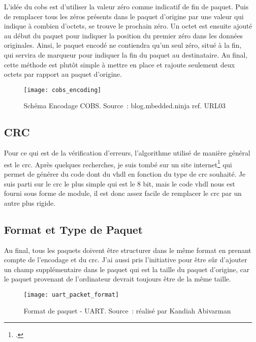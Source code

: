 L’idée du \gls{cobs} est d’utiliser la valeur zéro comme indicatif de fin de paquet. 
Puis de remplacer tous les zéros présents dans le paquet d’origine par une valeur qui indique à combien d’octets, se trouve le prochain zéro. 
Un octet est ensuite ajouté au début du paquet pour indiquer la position du premier zéro dans les données originales. 
Ainsi, le paquet encodé ne contiendra qu’un seul zéro, situé à la fin, qui servira de marqueur pour indiquer la fin du paquet au destinataire. 
Au final, cette méthode est plutôt simple à mettre en place et rajoute seulement deux octets par rapport au paquet d’origine.

\begin{figure}[tbph!]
	\centering
	\texttt{[image: cobs\_encoding]}
	\caption[Schéma Encodage COBS]{Schéma Encodage COBS. Source : blog.mbedded.ninja ref. URL03}
	\label{fig:cobs_encoding}
\end{figure}

\subsection{CRC}

Pour ce qui est de la vérification d'erreurs, l'algorithme utilisé de manière général est le \gls{crc}.
Après quelques recherches, je suis tombé sur un site internet\footcite{noauthor_generator_nodate} qui permet de générer du code dont du \gls{vhdl} en fonction du type de \gls{crc} souhaité.
Je suis parti sur le \gls{crc} le plus simple qui est le 8 bit, mais le code \gls{vhdl} nous est fourni sous forme de module, il est donc assez facile de remplacer le \gls{crc} par un autre plus rigide.

\subsection{Format et Type de Paquet}

Au final, tous les paquets doivent être structurer dans le même format en prenant compte de l'encodage et du \gls{crc}. 
J'ai aussi pris l'initiative pour être sûr d'ajouter un champ supplémentaire dans le paquet qui est la taille du paquet d'origine, car le paquet provenant de l'ordinateur devrait toujours être de la même taille. 

\begin{figure}[tbph!]
	\centering
	\texttt{[image: uart\_packet\_format]}
	\caption[Format de paquet - UART]{Format de paquet - UART. Source : réalisé par Kandiah Abivarman}
	\label{fig:uart_packet_format}
\end{figure}


